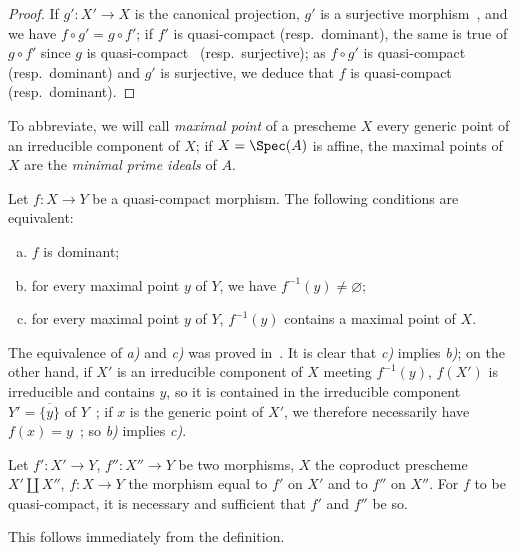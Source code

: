 \begin{proof}
If $g':X'\to X$ is the canonical projection, $g'$ is a surjective morphism~,
and we have $f\circ g'=g\circ f'$; if $f'$ is quasi-compact (resp.\ dominant), the same is true of $g\circ f'$
since $g$ is quasi-compact~ (resp.\ surjective); as $f\circ g'$ is quasi-compact
(resp.\ dominant) and $g'$ is surjective, we deduce that $f$ is quasi-compact~
(resp.\ dominant).
\end{proof}


To abbreviate, we will call \emph{maximal point} of a prescheme $X$ every generic point
of an irreducible component of $X$; if $X=\Spec(A)$ is affine, the maximal points
of $X$ are the \emph{minimal prime ideals} of $A$.

\begin{proposition}[1.1.5]
\label{IV.1.1.5}
Let $f:X\to Y$ be a quasi-compact morphism. The following
conditions are equivalent:
\begin{enumerate}[a)]
  \item $f$ is dominant;
  \item for every maximal point $y$ of $Y$, we have $f^{-1}(y)\neq\varnothing$;
  \item for every maximal point $y$ of $Y$, $f^{-1}(y)$ contains a maximal point of $X$.
\end{enumerate}
\end{proposition}

The equivalence of \emph{a)} and \emph{c)} was proved in~. It is clear that \emph{c)}
implies \emph{b)}; on the other hand, if $X'$ is an irreducible component of $X$ meeting $f^{-1}(y)$,
$f(X')$ is irreducible and contains $y$, so it is contained in the irreducible component
$Y'=\overline{\{y\}}$ of $Y$~; if $x$ is the generic point of $X'$, we therefore necessarily have
$f(x)=y$~; so \emph{b)} implies \emph{c)}.

\begin{proposition}[1.1.6]
\label{IV.1.1.6}
Let $f':X'\to Y$, $f'':X''\to Y$ be two morphisms, $X$ the coproduct prescheme
$X'\coprod X''$, $f:X\to Y$ the morphism equal to $f'$ on $X'$ and to $f''$ on $X''$. For $f$ to be
quasi-compact, it is necessary and sufficient that $f'$ and $f''$ be so.
\end{proposition}

This follows immediately from the definition.

